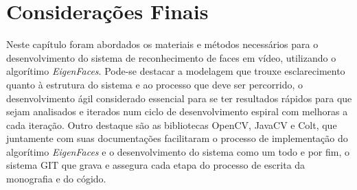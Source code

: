 \section{Considerações Finais}\label{sec:consfin}
Neste capítulo foram abordados os materiais e métodos necessários para o desenvolvimento do sistema de reconhecimento de faces em vídeo, utilizando o algorítimo \textit{EigenFaces}. Pode-se destacar a modelagem que trouxe esclarecimento quanto à estrutura do sistema e ao processo que deve ser percorrido, o desenvolvimento ágil considerado essencial para se ter resultados rápidos para que sejam analisados e iterados num ciclo de desenvolvimento espiral com melhoras a cada iteração. Outro destaque são as bibliotecas OpenCV, JavaCV e Colt, que juntamente com suas documentações facilitaram o processo de implementação do algorítimo \textit{EigenFaces} e o desenvolvimento do sistema como um todo e por fim, o sistema GIT que grava e assegura cada etapa do processo de escrita da monografia e do cógido.







%





